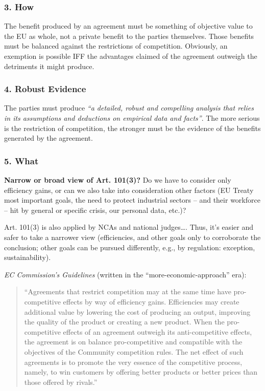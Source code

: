         \subsubsection{3. How}

            The benefit produced by an agreement must be something of objective value to the EU as whole, not a private benefit to the parties themselves. Those benefits must be balanced against the restrictions of competition. Obviously, an exemption is possible IFF the advantages claimed of the agreement outweigh the detriments it might produce.

        \subsubsection{4. Robust Evidence}

            The parties must produce \textit{“a detailed, robust and compelling analysis that relies in its assumptions and deductions on empirical data and facts”}. The more serious is the restriction of competition, the stronger must be the evidence of the benefits generated by the agreement.

        \subsubsection{5. What}

            \textbf{Narrow or broad view of Art. 101(3)?} Do we have to consider only efficiency gains, or can we also take into consideration other factors (EU Treaty most important goals, the need to protect industrial sectors – and their workforce – hit by general or specific crisis, our personal data, etc.)?

            Art. 101(3) is also applied by NCAs and national judges…. Thus, it’s easier and safer to take a narrower view (efficiencies, and other goals only to corroborate the conclusion; other goals can be pursued differently, e.g., by regulation: exception, sustainability).
            
            \textit{EC Commission’s Guidelines} (written in the “more-economic-approach” era):
            \begin{quote}
            “Agreements that restrict competition may at the same time have pro-competitive effects by way of efficiency gains. Efficiencies may create additional value by lowering the cost of producing an output, improving the quality of the product or creating a new product. When the pro-competitive effects of an agreement outweigh its anti-competitive effects, the agreement is on balance pro-competitive and compatible with the objectives of the Community competition rules. The net effect of such agreements is to promote the very essence of the competitive process, namely, to win customers by offering better products or better prices than those offered by rivals.”
            \end{quote}

